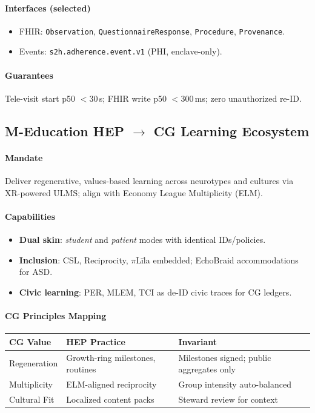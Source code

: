 \documentclass[11pt]{article}
\theoremstyle{plain}
\begin{document}
\paragraph{Interfaces (selected)}
\begin{itemize}
  \item FHIR: \texttt{Observation}, \texttt{QuestionnaireResponse}, \texttt{Procedure}, \texttt{Provenance}.
  \item Events: \texttt{s2h.adherence.event.v1} (PHI, enclave-only).
\end{itemize}

\paragraph{Guarantees}
Tele-visit start p50 $<30$\,s; FHIR write p50 $<300$\,ms; zero unauthorized re-ID.

\bigskip
\subsection*{M-Education HEP $\rightarrow$ CG Learning Ecosystem}
\paragraph{Mandate}
Deliver regenerative, values-based learning across neurotypes and cultures via XR-powered ULMS; align with Economy League Multiplicity (ELM).

\paragraph{Capabilities}
\begin{itemize}
  \item \textbf{Dual skin}: \emph{student} and \emph{patient} modes with identical IDs/policies.
  \item \textbf{Inclusion}: CSL, Reciprocity, $\pi$Līla embedded; EchoBraid accommodations for ASD.
  \item \textbf{Civic learning}: PER, MLEM, TCI as de-ID civic traces for CG ledgers.
\end{itemize}

\paragraph{CG Principles Mapping}
\begin{center}
\begin{tabular}{l l l}
\hline
CG Value & HEP Practice & Invariant \\
\hline
Regeneration & Growth-ring milestones, routines & Milestones signed; public aggregates only \\
Multiplicity & ELM-aligned reciprocity & Group intensity auto-balanced \\
Cultural Fit & Localized content packs & Steward review for context \\
\hline
\end{tabular}
\end{center}
\end{document}
